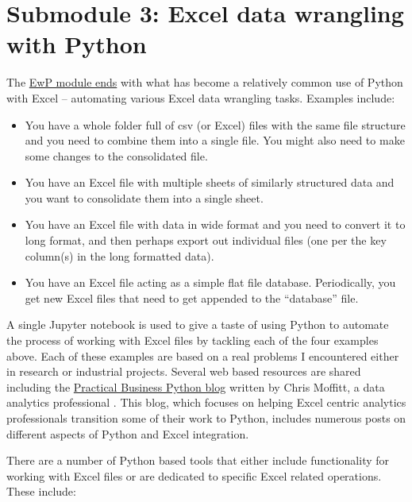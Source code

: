 \documentclass[ited,blindrev]{informs3}              %
\begin{document}
\section{Submodule 3: Excel data wrangling with Python}

The \href{http://www.sba.oakland.edu/faculty/isken/courses/mis6900/mod3c_python_excel.html}{EwP module ends} with what has become a relatively common use of Python with Excel -- automating various Excel data wrangling tasks. Examples include:

\begin{itemize}
	\item
	You have a whole folder full of csv (or Excel) files with the same
	file structure and you need to combine them into a single file. You
	might also need to make some changes to the consolidated file.
	\item
	You have an Excel file with multiple sheets of similarly structured
	data and you want to consolidate them into a single sheet.
	\item
	You have an Excel file with data in wide format and you need to
	convert it to long format, and then perhaps export out individual
	files (one per the key column(s) in the long formatted data).
	\item
	You have an Excel file acting as a simple flat file database.
	Periodically, you get new Excel files that need to get appended to the
	``database'' file.
\end{itemize}

A single Jupyter notebook is used to give a taste of using Python to automate the process of working with Excel files by tackling each of the four examples above. Each of these examples are based on a real problems I encountered either in research or industrial projects. Several web based resources are shared including the \href{https://pbpython.com/}{Practical Business Python blog} written by Chris Moffitt, a data analytics professional \cite{moffittPracticalBusinessPython2022}. This blog, which focuses on helping Excel centric analytics professionals transition some of their work to Python, includes numerous posts on different aspects of Python and Excel integration.  

There are a number of Python based tools that either include functionality for working with Excel files or are dedicated to specific Excel related operations. These include:
\end{document}
